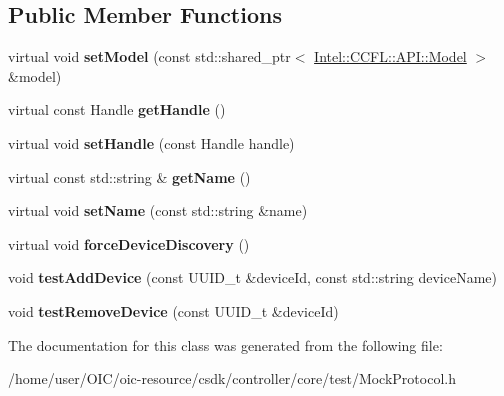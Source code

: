 \subsection*{Public Member Functions}
\begin{DoxyCompactItemize}
\item 
\hypertarget{classIntel_1_1CCFL_1_1Protocols_1_1MockProtocol_ad2125b0370d6eddb2b7f9c3afaad38d4}{}virtual void {\bfseries set\+Model} (const std\+::shared\+\_\+ptr$<$ \hyperlink{classIntel_1_1CCFL_1_1API_1_1Model}{Intel\+::\+C\+C\+F\+L\+::\+A\+P\+I\+::\+Model} $>$ \&model)\label{classIntel_1_1CCFL_1_1Protocols_1_1MockProtocol_ad2125b0370d6eddb2b7f9c3afaad38d4}

\item 
\hypertarget{classIntel_1_1CCFL_1_1Protocols_1_1MockProtocol_accc8ad01d36bddaadbf329e3d6c51374}{}virtual const Handle {\bfseries get\+Handle} ()\label{classIntel_1_1CCFL_1_1Protocols_1_1MockProtocol_accc8ad01d36bddaadbf329e3d6c51374}

\item 
\hypertarget{classIntel_1_1CCFL_1_1Protocols_1_1MockProtocol_a5e1bd8e3536bc5dabcf41e3807b810ea}{}virtual void {\bfseries set\+Handle} (const Handle handle)\label{classIntel_1_1CCFL_1_1Protocols_1_1MockProtocol_a5e1bd8e3536bc5dabcf41e3807b810ea}

\item 
\hypertarget{classIntel_1_1CCFL_1_1Protocols_1_1MockProtocol_a02c0401faccf57004441ab54a714e436}{}virtual const std\+::string \& {\bfseries get\+Name} ()\label{classIntel_1_1CCFL_1_1Protocols_1_1MockProtocol_a02c0401faccf57004441ab54a714e436}

\item 
\hypertarget{classIntel_1_1CCFL_1_1Protocols_1_1MockProtocol_a0e91bfa3ff7cf400e6ee8108849836f4}{}virtual void {\bfseries set\+Name} (const std\+::string \&name)\label{classIntel_1_1CCFL_1_1Protocols_1_1MockProtocol_a0e91bfa3ff7cf400e6ee8108849836f4}

\item 
\hypertarget{classIntel_1_1CCFL_1_1Protocols_1_1MockProtocol_a22b21c9ed8911e4f3b4f2e470695cded}{}virtual void {\bfseries force\+Device\+Discovery} ()\label{classIntel_1_1CCFL_1_1Protocols_1_1MockProtocol_a22b21c9ed8911e4f3b4f2e470695cded}

\item 
\hypertarget{classIntel_1_1CCFL_1_1Protocols_1_1MockProtocol_a1e8012f43b726201462bbc290ac00b94}{}void {\bfseries test\+Add\+Device} (const U\+U\+I\+D\+\_\+t \&device\+Id, const std\+::string device\+Name)\label{classIntel_1_1CCFL_1_1Protocols_1_1MockProtocol_a1e8012f43b726201462bbc290ac00b94}

\item 
\hypertarget{classIntel_1_1CCFL_1_1Protocols_1_1MockProtocol_aef8146348057c7e28cfd0d5974aa04be}{}void {\bfseries test\+Remove\+Device} (const U\+U\+I\+D\+\_\+t \&device\+Id)\label{classIntel_1_1CCFL_1_1Protocols_1_1MockProtocol_aef8146348057c7e28cfd0d5974aa04be}

\end{DoxyCompactItemize}


The documentation for this class was generated from the following file\+:\begin{DoxyCompactItemize}
\item 
/home/user/\+O\+I\+C/oic-\/resource/csdk/controller/core/test/Mock\+Protocol.\+h\end{DoxyCompactItemize}

